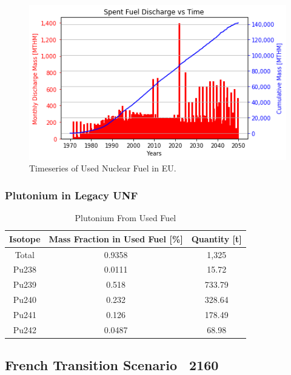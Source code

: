 \begin{frame}

\begin{figure}[htbp!]
	\begin{center}
			\includegraphics[scale=0.7]{./images/eu_future/snf_discharge.png}
	\end{center}
	\caption{Timeseries of Used Nuclear Fuel in \gls{EU}.}
	\label{fig:eu_snf}
\end{figure}

\end{frame}

\begin{frame}
	\frametitle{Plutonium in Legacy UNF}
	
\begin{table}[h]
	\centering
	\begin{tabular}{ccc}
		\hline
		\textbf{Isotope} & \textbf{Mass Fraction in Used Fuel [\%]} & \textbf{Quantity [t]} \\ \hline
		Total & 0.9358 & 1,325 \\ 
		Pu238 & 0.0111 & 15.72 \\ 
		Pu239 & 0.518 & 733.79 \\ 
		Pu240 & 0.232 & 328.64 \\ 
		Pu241 & 0.126 & 178.49 \\ 
		Pu242 & 0.0487 & 68.98 \\ \hline
	\end{tabular}
	\caption{Plutonium From Used Fuel}
	\label{tab:pu}
\end{table}
\end{frame}


\subsection{French Transition Scenario ~2160}

